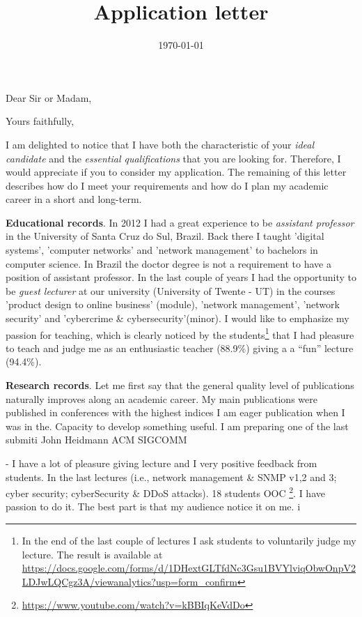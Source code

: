 \documentclass[11pt,a4paper,sans]{moderncv}%
\title{Application letter}
\begin{document}
\date{\today} %
\opening{Dear Sir or Madam,}
\closing{Yours faithfully,}

\makelettertitle

\justify
I am delighted to notice that I have both the characteristic of your \textit{ideal
candidate} and the \textit{essential qualifications} that you are looking for.
Therefore, I would appreciate if you to consider my application. The remaining
of this letter describes how do I meet your requirements and how do I plan my
academic career in a short and long-term.

\textbf{Educational records}. In 2012 I had a great experience to be
\textit{assistant professor} in the University of Santa Cruz do Sul, Brazil.
Back there I taught 'digital systems', 'computer networks' and 'network
management' to bachelors in computer science. In Brazil the doctor degree is not
a requirement to have a position of assistant professor. In the last couple of
years I had the opportunity to be \textit{guest lecturer} at our university
(University of Twente - UT) in the courses 'product design to online business'
(module), 'network management', 'network security' and 'cybercrime \&
cybersecurity'(minor). I would like to emphasize my passion for teaching, which
is clearly noticed by the students\footnote{In the end of the last couple of
lectures I ask students to voluntarily judge my lecture. The result is available
at
\url{https://docs.google.com/forms/d/1DHextGLTfdNc3Gsu1BVYlviqObwOnpV2LDJwLQCgz3A/viewanalytics?usp=form_confirm}}
that I had pleasure to teach and judge me as an enthusiastic teacher (88.9\%)
giving a a ``fun'' lecture (94.4\%). 

\textbf{Research records}. Let me first say that the general quality level of
publications naturally improves along an academic career. My main publications
were published in conferences with the highest indices I am eager publication
when I was in the.  Capacity to develop something useful.  I am preparing one of
the last submiti John Heidmann ACM SIGCOMM

- I have a lot of pleasure giving lecture and I very positive feedback from
students. In the last lectures (i.e., network management \& SNMP v1,2 and 3;
cyber security; cyberSecurity \& DDoS attacks). 18 students
OOC \footnote{\url{https://www.youtube.com/watch?v=kBBIqKeVdDo}}.  I have passion to do it. The best part is that my audience notice it on
me.  i
\end{document}

